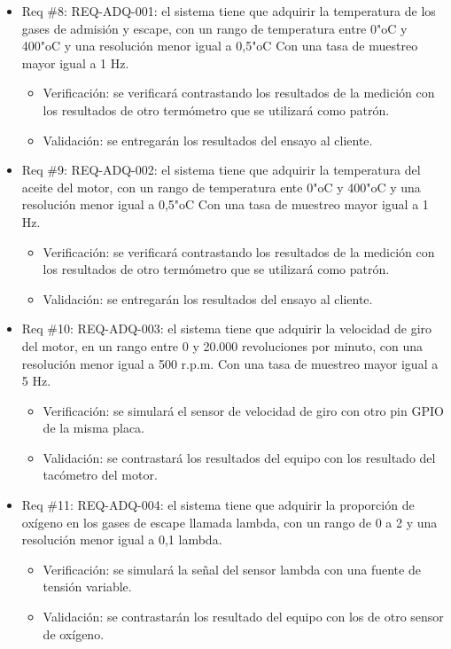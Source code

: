 \documentclass[11pt]{charter}
\begin{document}
\begin{itemize} 
\item Req \#8: REQ-ADQ-001: el sistema tiene que adquirir la temperatura de los gases de
admisión y escape, con un rango de temperatura entre 0"oC y 400"oC y una resolución
menor igual a 0,5"oC Con una tasa de muestreo mayor igual a 1 Hz.
\begin{itemize}
\item Verificación: se verificará contrastando los resultados de la medición con los resultados de otro termómetro que se utilizará como patrón.
\item Validación: se entregarán los resultados del ensayo al cliente.
\end{itemize}
\end{itemize}

\begin{itemize} 
\item Req \#9: REQ-ADQ-002: el sistema tiene que adquirir la temperatura del aceite del motor, con un rango de temperatura ente 0"oC y 400"oC y una resolución menor igual a 0,5"oC Con una tasa de muestreo mayor igual a 1 Hz.
\begin{itemize}
\item Verificación: se verificará contrastando los resultados de la medición con los resultados de otro termómetro que se utilizará como patrón.
\item Validación: se entregarán los resultados del ensayo al cliente.
\end{itemize}
\end{itemize}

\begin{itemize} 
\item Req \#10: REQ-ADQ-003: el sistema tiene que adquirir la velocidad de giro del motor, en
un rango entre 0 y 20.000 revoluciones por minuto, con una resolución menor igual
a 500 r.p.m. Con una tasa de muestreo mayor igual a 5 Hz.
\begin{itemize}
\item Verificación: se simulará el sensor de velocidad de giro con otro pin GPIO de la misma placa.
\item Validación: se contrastará los resultados del equipo con los resultado del tacómetro del motor.
\end{itemize}
\end{itemize}

\begin{itemize} 
\item Req \#11: REQ-ADQ-004: el sistema tiene que adquirir la proporción de oxígeno en los gases
de escape llamada lambda, con un rango de 0 a 2 y una resolución menor igual a 0,1
lambda.
\begin{itemize}
\item Verificación: se simulará la señal del sensor lambda con una fuente de tensión variable.
\item Validación: se contrastarán los resultado del equipo con los de otro sensor de oxígeno.
\end{itemize}
\end{itemize}
\end{document}
